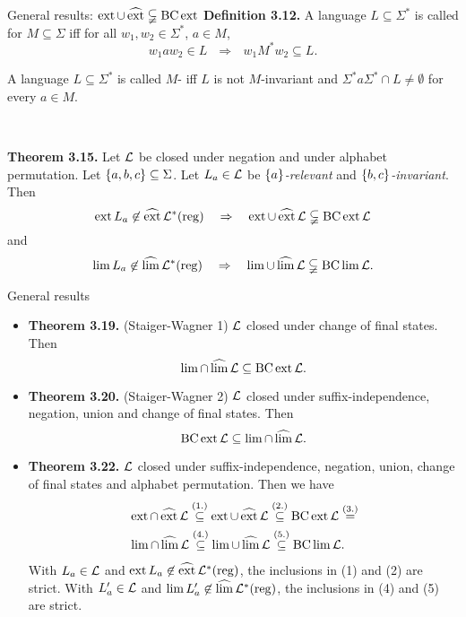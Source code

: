 \documentclass[
	notheorems,noamsthm]{beamer}
\begin{document}
\begin{frame}[<+->]{General results: $\operatorname{ext} \cup \operatorname{\widehat{ext}} \subsetneqq \operatorname{BC} \operatorname{ext}$}
\textbf{Definition 3.12.} A language $L \subseteq \Sigma^*$ is called  for $M \subseteq\Sigma$ iff for all $w_1,w_2 \in \Sigma^*$, $a \in M$,
\[ w_1 a w_2 \in L \ \ \ \Rightarrow \ \ \  w_1 M^* w_2 \subseteq L . \]

A language $L \subseteq \Sigma^*$ is called $M$- iff $L$ is not $M$-invariant and $\Sigma^* a \Sigma^* \cap L \ne \emptyset$ for every $a \in M$.

\

\textbf{Theorem 3.15.} Let $\mathcal{L}$ be closed under negation and under alphabet permutation. Let $\Set{a,b,c} \subseteq \Sigma$. Let $L_a \in \mathcal{L}$ be \emph{$\Set{a}$-relevant} and \emph{$\Set{b,c}$-invariant}. Then
\[ \operatorname{ext} L_a \not\in \operatorname{\widehat{ext}} \mathcal{L}^*(\textup{\textrm{reg}}) \ \ \ \Rightarrow \ \ \ \operatorname{ext} \cup \operatorname{\widehat{ext}} \mathcal{L} \subsetneqq \operatorname{BC} \operatorname{ext} \mathcal{L} \]
and
\[ \lim L_a \not\in \dlim \Langreg \ \ \ \Rightarrow \ \ \ \lim \cup \dlim \Lang \subsetneqq \BC \lim \Lang . \]
\end{frame}

\begin{frame}[<+->]{General results}
\begin{itemize}
\item \textbf{Theorem 3.19.} (Staiger-Wagner 1) $\mathcal{L}$ closed under change of final states. Then
\[ \lim \cap \operatorname{\widehat{lim}} \mathcal{L} \subseteq \operatorname{BC} \operatorname{ext} \mathcal{L} . \]
\item \textbf{Theorem 3.20.} (Staiger-Wagner 2) $\mathcal{L}$ closed under suffix-independence, negation, union and change of final states. Then
\[ \operatorname{BC} \operatorname{ext} \mathcal{L} \subseteq \lim \cap \operatorname{\widehat{lim}} \mathcal{L} . \]
\item \textbf{Theorem 3.22.} $\mathcal{L}$ closed under suffix-independence, negation, union, change of final states and alphabet permutation.
Then we have
\begin{align*}
& \operatorname{ext} \cap \operatorname{\widehat{ext}} \mathcal{L} \stackrel{(1.)}\subseteq
\operatorname{ext} \cup \operatorname{\widehat{ext}} \mathcal{L} \stackrel{(2.)}\subseteq
\operatorname{BC} \operatorname{ext} \mathcal{L} \stackrel{(3.)}= \\
& \lim \cap \operatorname{\widehat{lim}} \mathcal{L} \stackrel{(4.)}\subseteq
\lim \cup \operatorname{\widehat{lim}} \mathcal{L} \stackrel{(5.)}\subseteq
\operatorname{BC} \lim \mathcal{L} .
\end{align*}
With $L_a \in \mathcal{L}$ and $\operatorname{ext} L_a \not\in \operatorname{\widehat{ext}} \mathcal{L}^*(\textup{\textrm{reg}})$, the inclusions in (1) and (2) are strict.
With $L'_a \in \mathcal{L}$ and  $\lim L'_a \not\in \operatorname{\widehat{lim}} \mathcal{L}^*(\textup{\textrm{reg}})$, the inclusions in (4) and (5) are strict.\end{itemize}
\end{frame}
\end{document}
